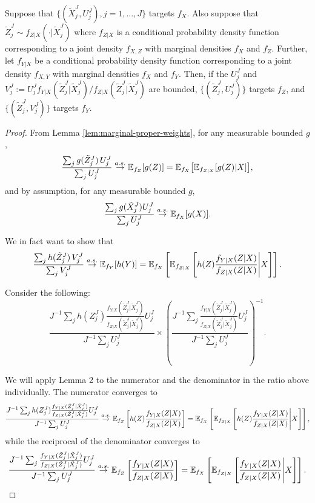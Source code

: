 \begin{lem}
    \label{lem:change-marginal-proper-weights}
    Suppose that $\{(\tilde X_j^J,U_j^J),j=1,\dots,J\}$ targets $f_X$. Also suppose that $\tilde Z_j^J \sim f_{Z|X}(\cdot | \tilde X_j^J)$ where $f_{Z|X}$ is a conditional probability density function corresponding to a joint density $f_{X,Z}$ with marginal densities $f_X$ and $f_Z$. Further, let $f_{Y|X}$ be a conditional probability density function corresponding to a joint density $f_{X,Y}$ with marginal densities $f_X$ and $f_Y$. Then, if the $U_j^J$ and $V_j^J := U_j^Jf_{Y|X}(\tilde{Z}_j^J|\tilde{X}_{j}^J)/f_{Z|X}(\tilde{Z}_j^J|\tilde{X}_{j}^J)$ are bounded, $\{(\tilde Z_j^J,U_j^J)\}$ targets $f_Z$, and $\{(\tilde Z_j^J,V_j^J)\}$ targets $f_Y$.
\end{lem}
\begin{proof}
    From Lemma \ref{lem:marginal-proper-weights}, for any measurable bounded $g$, 
     $$\frac{\sum_j g(\tilde Z_j^J) \, U_j^J}{\sum_j U_j^J} \stackrel{a.s.}{\to} \mathbb{E}_{f_Z}[g(Z)] = \mathbb{E}_{f_X}\big[\mathbb{E}_{f_{Z|X}}[g(Z) | X]\big],$$
     and by assumption, for any measurable bounded $g$, 
    $$\frac{\sum_j g(\tilde X_j^J)U_j^J}{\sum_j U_j^J} \stackrel{a.s.}{\to} \mathbb{E}_{f_X}[g(X)].$$

    We in fact want to show that 
    $$\frac{\sum_j h(\tilde Z_j^J) \, V_j^J}{\sum_j V_j^J} \stackrel{a.s.}{\to} \mathbb{E}_{f_Y}[h(Y)] = \mathbb{E}_{f_X}\left[\mathbb{E}_{f_{Z|X}}\left[h(Z)\frac{f_{Y|X}(Z|X)}{f_{Z|X}(Z|X)} \Bigg| X\right]\right].$$

    Consider the following:
    \begin{equation}
    \frac{J^{-1} \sum_j h(Z_j^J) \frac{f_{Y|X}(\tilde Z_j^J|\tilde X_j^J)}{f_{Z|X}(\tilde Z_j^J|\tilde X_j^J)} {U}_j^{J}}{J^{-1} \sum_j {U}_j^{J}}
    \times \left( \frac{J^{-1} \sum_j \frac{f_{Y|X}(\tilde Z_j^J|\tilde X_j^J)}{f_{Z|X}(\tilde Z_j^J|\tilde X_j^J)} {U}_j^{J}}{J^{-1} \sum_j {U}_j^{J}} \right)^{-1}.
    \end{equation}

    We will apply Lemma 2 to the numerator and the denominator in the ratio above individually. The numerator converges to 
    $$\frac{J^{-1} \sum_j h(Z_j^J)  \frac{f_{Y|X}(\tilde Z_j^J|\tilde X_j^J)}{f_{Z|X}(\tilde Z_j^J|\tilde X_j^J)} {U}_j^{J}}{J^{-1} \sum_j {U}_j^{J}} \stackrel{a.s.}{\to} \mathbb{E}_{f_Z}\left[h(Z) \frac{f_{Y|X}(Z|X)}{f_{Z|X}(Z|X)}\right] = \mathbb{E}_{f_X}\left[\mathbb{E}_{f_{Z|X}}\left[h(Z)\frac{f_{Y|X}(Z|X)}{f_{Z|X}(Z|X)}\Bigg|X\right]\right],$$
    while the reciprocal of the denominator converges to 
    $$ \frac{J^{-1} \sum_j \frac{f_{Y|X}(\tilde Z_j^J|\tilde X_j^J)}{f_{Z|X}(\tilde Z_j^J|\tilde X_j^J)}{U}_j^{J}}{J^{-1} \sum_j {U}_j^{J}}  \stackrel{a.s.}{\to} \mathbb{E}_{f_Z}\left[ \frac{f_{Y|X}(Z|X)}{f_{Z|X}(Z|X)}\right] = \mathbb{E}_{f_X}\left[\mathbb{E}_{f_{Z|X}}\left[\frac{f_{Y|X}(Z|X)}{f_{Z|X}(Z|X)}\Bigg|X\right]\right] .$$


\end{proof}
